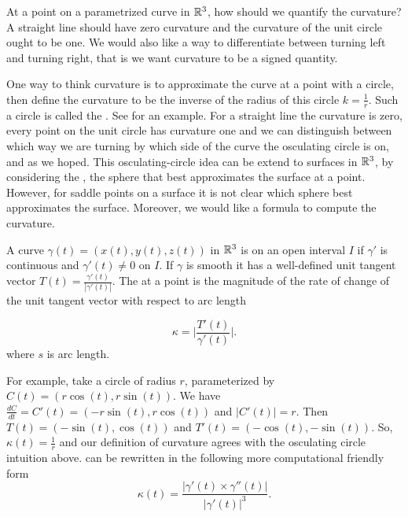 

At a point on a parametrized curve  in $\mathbb{R}^3$,
how should we quantify the curvature?
A straight line should have zero curvature and the curvature of the unit circle ought to be one.
We would also like a way to differentiate
between turning left and turning right, that is we want curvature to be a signed quantity.

One way to think curvature is to approximate the curve at a point with a circle,
then define the curvature to be the inverse of the radius of this circle $k=\frac{1}{r}$.
Such a circle is called the .
See  for an example.
For a straight line the curvature is zero, 
every point on the unit circle has curvature one 
and we can distinguish between
which way we are turning by which side of the curve the osculating circle is on,
 and as we hoped.
 This osculating-circle idea can be extend
to  surfaces in $\mathbb{R}^3$, by considering the ,
 the sphere that best approximates the surface at a point.
However, for saddle points on a surface it is not clear which sphere
best approximates the surface. Moreover, we would like a formula to compute the curvature.

A curve $\gamma(t)=(x(t),y(t),z(t))$ in $\mathbb{R}^3$ is  on an open interval $I$
if $\gamma'$ is continuous and $\gamma'(t)\neq 0$ on $I$. 
If $\gamma$ is smooth it has a well-defined unit tangent vector $T(t)=\frac{\gamma'(t)}{|\gamma'(t)|}.$
The  at a point is the magnitude of the rate of change of the unit tangent vector with 
respect to arc length

\begin{equation} \label{eqn:kappa}
\kappa=\bigg  | \frac{T'(t)}{\gamma'(t)}\bigg |.
\end{equation}
where $s$ is arc length.

For example, take a circle of radius $r$, parameterized by $C(t)=\left(r\cos(t),r\sin(t)\right)$.
We have $\frac{dC}{dt}=C'(t)=\left(-r\sin(t),r\cos(t)\right)$ and $|C'(t)|=r$.
Then $T(t)=\left(-\sin(t),\cos(t)\right)$ and $T'(t)=\left(-\cos(t),-\sin(t)\right)$.
So, $\kappa(t)=\frac{1}{r}$ and our definition of curvature agrees with the
osculating circle intuition above. 
 can be rewritten in the following more computational friendly form 
\begin{equation} \label{eqn:kappa1}
\kappa(t)=\frac{|\gamma'(t)\times \gamma''(t)|}{|\gamma'(t)|^3}.
\end{equation}

